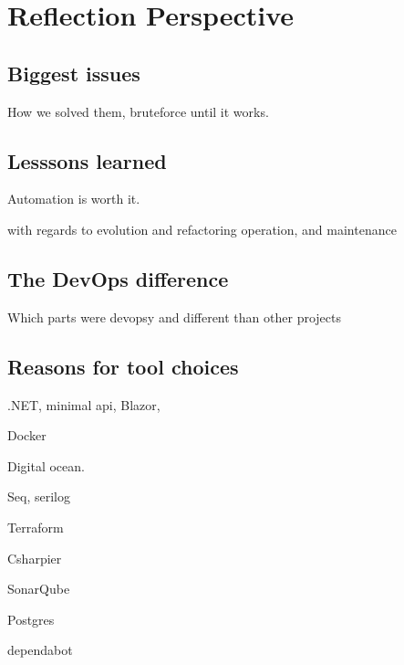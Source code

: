 \section{Reflection Perspective}

\subsection{Biggest issues}

How we solved them, bruteforce until it works.

\subsection{Lesssons learned}

Automation is worth it.

with regards to
evolution and refactoring
operation, and
maintenance

\subsection{The DevOps difference}

Which parts were devopsy and different than other projects

\subsection{Reasons for tool choices}

.NET, minimal api, Blazor,

Docker

Digital ocean.

Seq, serilog

Terraform

Csharpier

SonarQube

Postgres

dependabot